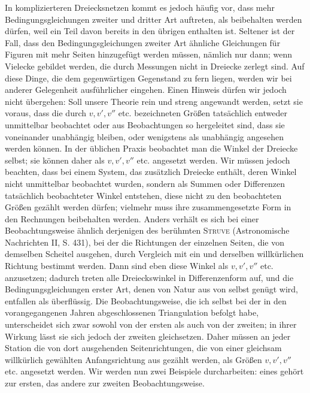 In komplizierteren Dreiecksnetzen kommt es jedoch häufig vor, dass mehr Bedingungsgleichungen zweiter und dritter Art auftreten, als beibehalten werden dürfen, weil ein Teil davon bereits in den übrigen enthalten ist. Seltener ist der Fall, dass den Bedingungsgleichungen zweiter Art ähnliche Gleichungen für Figuren mit mehr Seiten hinzugefügt werden müssen, nämlich nur dann; wenn 
Vielecke gebildet werden, die durch Messungen nicht in Dreiecke zerlegt sind. Auf diese Dinge, die dem gegenwärtigen Gegenstand zu fern liegen, werden wir bei anderer Gelegenheit ausführlicher eingehen. Einen Hinweis dürfen wir jedoch nicht übergehen: Soll unsere Theorie rein und streng angewandt werden, setzt sie voraus, dass die durch \(v,v',v''\) etc. bezeichneten Größen tatsächlich entweder unmittelbar beobachtet oder aus Beobachtungen so hergeleitet sind, dass sie voneinander unabhängig bleiben, oder wenigstens als unabhängig angesehen werden können. In der üblichen Praxis beobachtet man die Winkel der Dreiecke selbst; sie können daher als \(v,v',v''\) etc. angesetzt werden. Wir müssen jedoch beachten, dass bei einem System, das zusätzlich Dreiecke enthält, deren Winkel nicht unmittelbar beobachtet wurden, sondern als Summen oder Differenzen tatsächlich beobachteter Winkel entstehen, diese nicht zu den beobachteten Größen gezählt werden dürfen; vielmehr muss ihre zusammengesetzte Form in den Rechnungen beibehalten werden. Anders verhält es sich bei einer Beobachtungsweise ähnlich derjenigen des berühmten \textsc{Struve} (Astronomische Nachrichten II, S. 431), bei der die Richtungen der einzelnen Seiten, die von demselben Scheitel ausgehen, durch Vergleich mit ein und derselben willkürlichen Richtung bestimmt werden. Dann sind eben diese Winkel als \(v,v',v''\) etc. anzusetzen; dadurch treten alle Dreieckswinkel in Differenzenform auf, und die Bedingungsgleichungen erster Art, denen von Natur aus von selbst genügt wird, entfallen als überflüssig. Die Beobachtungsweise, die ich selbst bei der in den vorangegangenen Jahren abgeschlossenen Triangulation befolgt habe, unterscheidet sich zwar sowohl von der ersten als auch von der zweiten; in ihrer Wirkung lässt sie sich jedoch der zweiten gleichsetzen. Daher müssen an jeder Station die von dort ausgehenden Seitenrichtungen, die von einer gleichsam willkürlich gewählten Anfangsrichtung aus gezählt werden, als Größen \(v,v',v''\) etc. angesetzt werden. Wir werden nun zwei Beispiele durcharbeiten: eines gehört zur ersten, das andere zur zweiten Beobachtungsweise.
